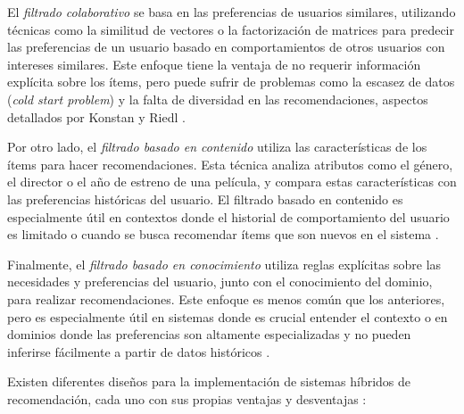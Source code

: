 \documentclass{llncs}
\begin{document}
	El \textit{filtrado colaborativo} se basa en las preferencias de usuarios similares, utilizando técnicas como la similitud de vectores o la factorización de matrices para predecir las preferencias de un usuario basado en comportamientos de otros usuarios con intereses similares. Este enfoque tiene la ventaja de no requerir información explícita sobre los ítems, pero puede sufrir de problemas como la escasez de datos (\textit{cold start problem}) y la falta de diversidad en las recomendaciones, aspectos detallados por Konstan y Riedl \cite{konstan2012recommender}.
	
	Por otro lado, el \textit{filtrado basado en contenido} utiliza las características de los ítems para hacer recomendaciones. Esta técnica analiza atributos como el género, el director o el año de estreno de una película, y compara estas características con las preferencias históricas del usuario. El filtrado basado en contenido es especialmente útil en contextos donde el historial de comportamiento del usuario es limitado o cuando se busca recomendar ítems que son nuevos en el sistema \cite{lops2011content}.
	
	Finalmente, el \textit{filtrado basado en conocimiento} utiliza reglas explícitas sobre las necesidades y preferencias del usuario, junto con el conocimiento del dominio, para realizar recomendaciones. Este enfoque es menos común que los anteriores, pero es especialmente útil en sistemas donde es crucial entender el contexto o en dominios donde las preferencias son altamente especializadas y no pueden inferirse fácilmente a partir de datos históricos \cite{adomavicius2005toward}.
	
	Existen diferentes diseños para la implementación de sistemas híbridos de recomendación, cada uno con sus propias ventajas y desventajas \cite{burke2002hybrid}:
	
\end{document}
